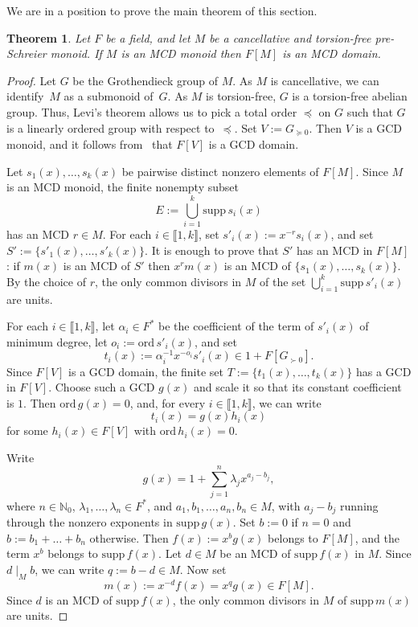 \documentclass[10pt]{amsart}
\newtheorem{theorem}{Theorem}[section]
\theoremstyle{definition}
\theoremstyle{remark}
\numberwithin{equation}{section}
\newcommand{\nn}{\mathbb{N}}
\providecommand\ldb{\llbracket}
\providecommand\rdb{\rrbracket}
\newcommand{\ord}{\mathrm{ord}}
\begin{document}
We are in a position to prove the main theorem of this section.

\begin{theorem}
  Let $F$ be a field, and let $M$ be a cancellative and torsion-free pre-Schreier monoid. If $M$ is an MCD monoid then $F[M]$ is an MCD domain.
\end{theorem}

\begin{proof}
  Let $G$ be the Grothendieck group of $M$. As $M$ is cancellative, we can identify~$M$ as a submonoid of~$G$. As $M$ is torsion-free, $G$ is a torsion-free abelian group. Thus, Levi's theorem allows us to pick a total order $\preceq$ on $G$ such that $G$ is a linearly ordered group with respect to~$\preceq$. Set $V:=G_{\succeq 0}$. Then $V$ is a GCD monoid, and it follows from~\cite[Theorem~14.5]{rG84} that $F[V]$ is a GCD domain.

  Let $s_1(x),\dots,s_k(x)$ be pairwise distinct nonzero elements of $F[M]$. Since $M$ is an MCD monoid, the finite nonempty subset
  \[
    E:=\bigcup_{i=1}^k \text{supp}\,s_i(x)
  \]
  has an MCD $r \in M$. For each $i \in \ldb 1,k \rdb$, set $s'_i(x):=x^{-r}s_i(x)$, and set $S':=\{s'_1(x),\dots,s'_k(x)\}$. It is enough to prove that $S'$ has an MCD in $F[M]$: if $m(x)$ is an MCD of $S'$ then $x^rm(x)$ is an MCD of $\{s_1(x),\dots,s_k(x)\}$. By the choice of $r$, the only common divisors in $M$ of the set $\bigcup_{i=1}^k \text{supp}\,s'_i(x)$ are units.

  For each $i \in \ldb 1,k \rdb$, let $\alpha_i \in F^*$ be the coefficient of the term of $s'_i(x)$ of minimum degree, let $o_i:=\ord\,s'_i(x)$, and set
  \[
    t_i(x):=\alpha_i^{-1}x^{-o_i}s'_i(x) \in 1+F[G_{\succ 0}].
  \]
  Since $F[V]$ is a GCD domain, the finite set $T:=\{t_1(x),\dots,t_k(x)\}$ has a GCD in $F[V]$. Choose such a GCD $g(x)$ and scale it so that its constant coefficient is $1$. Then $\ord\,g(x)=0$, and, for every $i \in \ldb 1,k \rdb$, we can write
  \[
    t_i(x)=g(x)h_i(x)
  \]
  for some $h_i(x) \in F[V]$ with $\ord\,h_i(x)=0$.

  Write
  \[
    g(x)=1+\sum_{j=1}^n \lambda_jx^{a_j-b_j},
  \]
  where $n \in \nn_0$, $\lambda_1,\dots,\lambda_n \in F^*$, and $a_1,b_1,\dots,a_n,b_n \in M$, with $a_j-b_j$ running through the nonzero exponents in $\text{supp}\,g(x)$. Set $b:=0$ if $n=0$ and $b:=b_1+\dots+b_n$ otherwise. Then $f(x):=x^bg(x)$ belongs to $F[M]$, and the term $x^b$ belongs to $\text{supp}\,f(x)$. Let $d \in M$ be an MCD of $\text{supp}\,f(x)$ in $M$. Since $d \mid_M b$, we can write $q:=b-d \in M$. Now set
  \[
    m(x):=x^{-d}f(x)=x^qg(x) \in F[M].
  \]
  Since $d$ is an MCD of $\text{supp}\,f(x)$, the only common divisors in $M$ of $\text{supp}\,m(x)$ are units.


\end{proof}
\end{document}
